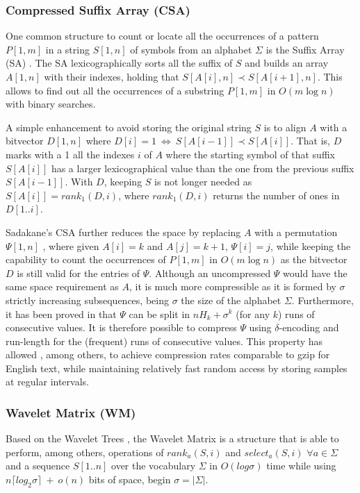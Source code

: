 \documentclass[runningheads]{llncs}
\begin{document}
\subsubsection{Compressed Suffix Array (CSA)}
\label{sec:csa}
One common structure to count or locate all the occurrences of a pattern $P[1,m]$ in a string $S[1,n]$ of symbols from an alphabet $\Sigma$ is the Suffix Array (SA) \cite{MM93}. The SA lexicographically sorts all the suffix of $S$ and builds an array $A[1,n]$ with their indexes, holding that $S[A[i],n] \prec S[A[i+1],n]$. This allows to find out all the occurrences of a substring $P[1,m]$ in $O(m \log n)$ with binary searches.

A simple enhancement to avoid storing the original string $S$ is to align $A$ with a bitvector $D[1,n]$ where $D[i]=1~\Leftrightarrow~S[A[i-1]] \prec S[A[i]]$. That is, $D$ marks with a 1 all the indexes $i$ of $A$ where the starting symbol of that suffix $S[A[i]]$ has a larger lexicographical value than the one from the previous suffix $S[A[i-1]]$. With $D$, keeping $S$ is not longer needed as $S[A[i]] = rank_1(D,i)$, where $rank_1(D,i)$ returns the number of ones in $D[1..i]$.

Sadakane's CSA \cite{Sad03} further reduces the space by replacing $A$ with a permutation $\Psi[1,n]$ \cite{GV00}, where given $A[i]=k$ and $A[j]=k+1$, $\Psi[i]=j$, while keeping the capability to count the occurrences of $P[1,m]$ in $O(m \log n)$ as the bitvector $D$ is still valid for the entries of $\Psi$. Although an uncompressed $\Psi$ would have the same space requirement as $A$, it is much more compressible as it is formed by $\sigma$ strictly increasing subsequences, being $\sigma$ the size of the alphabet $\Sigma$. Furthermore, it has been proved in \cite{NM07} that $\Psi$ can be split in $nH_k+\sigma^k$ (for any $k$) runs of consecutive values. It is therefore possible to compress $\Psi$ using $\delta$-encoding and run-length for the (frequent) runs of consecutive values. This property has allowed \cite{FBNCPR12}, among others, to achieve compression rates comparable to gzip for English text, while maintaining relatively fast random access by storing samples at regular intervals.

\subsubsection{Wavelet Matrix (WM)}
\label{sec:wm}
Based on the Wavelet Trees \cite{WT03}, the Wavelet Matrix \cite{CNO15} is a structure that is able to perform, among others, operations of $rank_a(S,i)$ and $select_a(S,i)$ $\forall a \in \Sigma$ and a sequence $S[1..n]$ over the vocabulary $\Sigma$ in $O(log\sigma)$ time while using $n\lceil log_2\sigma\rceil~+~o(n)$ bits of space, begin $\sigma = |\Sigma|$.
\end{document}
